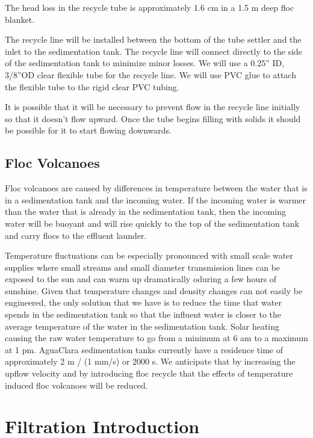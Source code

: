 \documentclass[letterpaper,10pt,english]{sphinxmanual}
\begin{document}
The head loss in the recycle tube is approximately 1.6 cm in a 1.5 m deep floc blanket.

The recycle line will be installed between the bottom of the tube settler and the inlet to the sedimentation tank. The recycle line will connect  directly to the side of the sedimentation tank to minimize minor losses. We will use a 0.25” ID, 3/8”OD clear flexible tube for the recycle line. We will use PVC glue to attach the flexible tube to the rigid clear PVC tubing.

It is possible that it will be necessary to prevent flow in the recycle line initially so that it doesn’t flow upward. Once the tube begins filling with solids it should be possible for it to start flowing downwards.


\section{Floc Volcanoes}
\label{\detokenize{Sedimentation/Sed_Theory_and_Future_Work:floc-volcanoes}}\label{\detokenize{Sedimentation/Sed_Theory_and_Future_Work:id3}}
Floc volcanoes are caused by differences in temperature between the water that is in a sedimentation tank and the incoming water. If the incoming water is warmer than the water that is already in the sedimentation tank, then the incoming water will be buoyant and will rise quickly to the top of the sedimentation tank and carry flocs to the effluent launder.

Temperature fluctuations can be especially pronounced with small scale water supplies where small streams and small diameter transmission lines can be exposed to the sun and can warm up dramatically oduring a few hours of sunshine. Given that temperature changes and density changes can not easily be engineered, the only solution that we have is to reduce the time that water spends in the sedimentation tank so that the influent water is closer to the average temperature of the water in the sedimentation tank. Solar heating causing the raw water temperature to go from a minimum at 6 am to a maximum at 1 pm. AguaClara sedimentation tanks currently have a residence time of approximately 2 m / (1 mm/s) or 2000 s. We anticipate that by increasing the upflow velocity and by introducing floc recycle that the effects of temperature induced floc volcanoes will be reduced.


\chapter{Filtration  Introduction}
\label{\detokenize{Filtration/Filtration_Intro:filtration-introduction}}\label{\detokenize{Filtration/Filtration_Intro:title-filtration-introduction}}\label{\detokenize{Filtration/Filtration_Intro::doc}}
\end{document}

